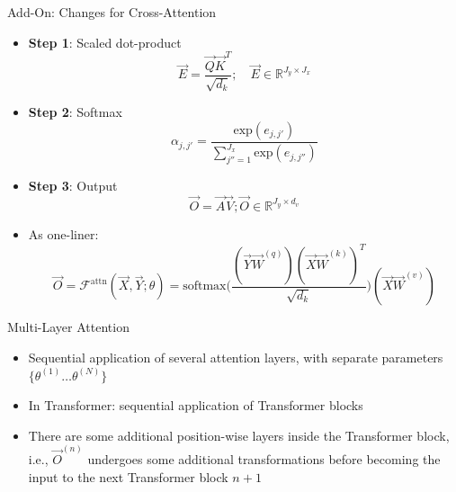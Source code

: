 \begin{frame}{Add-On: Changes for Cross-Attention}
\small

\vfill

\begin{itemize}
	  \item \textbf{Step 1}: Scaled dot-product $$\vec {E} = \frac{ \vec {Q} \vec {K}^T}{\sqrt{d_k}}; \quad \vec E \in \mathbb{R}^{J_y \times J_x}$$
	  \item \textbf{Step 2}: Softmax $$\alpha_{j,j'} = \frac{\mathrm{exp}(e_{j,j'})}{\sum_{j''=1}^{J_x} \mathrm{exp}(e_{j,j''})}$$
		\item \textbf{Step 3}: Output $$\vec {O} = \vec {A} \vec {V}; \vec O \in \mathbb{R}^{J_y \times d_v}$$
		\item As one-liner: $$ \vec O = \mathcal{F}^\mathrm{attn}(\vec X, \vec Y; \theta) = \mathrm{softmax}\Big(\frac{(\vec Y\vec W^{(q)} ) (\vec X\vec W^{(k)} )^T}{\sqrt{d_k}}\Big)(\vec X\vec W^{(v)} ) $$
\end{itemize}

\vfill

\end{frame}

\begin{vbframe}{Multi-Layer Attention}

\vfill

\begin{itemize}
\item Sequential application of several attention layers, with separate parameters $\{\theta^{(1)} \ldots \theta^{(N)}\}$
\item In Transformer: sequential application of Transformer blocks
\item There are some additional position-wise layers inside the Transformer block, i.e., $\vec O^{(n)}$ undergoes some additional transformations before becoming the input to the next Transformer block $n+1$
\end{itemize}

\vfill

\end{vbframe}


